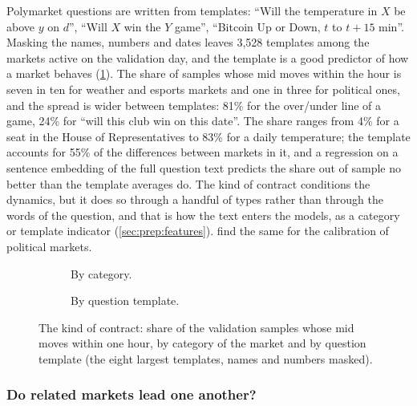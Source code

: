 Polymarket questions are written from templates: ``Will the temperature in $X$ be above
$y$ on $d$'', ``Will $X$ win the $Y$ game'', ``Bitcoin Up or Down, $t$ to $t + 15$ min''.
Masking the names, numbers and dates leaves 3{,}528 templates among the markets active on
the validation day, and the template is a good predictor of how a market behaves
(\cref{fig:expl:contract}).  The share of samples whose mid moves within the hour is seven
in ten for weather and esports markets and one in three for political ones, and the spread
is wider between templates: 81\% for the over/under line of a game, 24\% for ``will this
club win on this date''.  The share ranges from 4\% for a seat in the House of
Representatives to 83\% for a daily temperature; the template accounts for 55\% of the
differences between markets in it, and a regression on a sentence embedding of the full
question text predicts the share out of sample no better than the template averages do.  The kind of
contract conditions the dynamics, but it does so through a handful of types rather than
through the words of the question, and that is how the text enters the models, as a
category or template indicator (\cref{sec:prep:features}).  \textcite{le2026calibration}
find the same for the calibration of political markets.

\begin{figure}[t]
\centering
\begin{subfigure}[t]{0.5\textwidth}\centering\caption{By category.}\end{subfigure}%
\begin{subfigure}[t]{0.5\textwidth}\centering\caption{By question template.}\end{subfigure}
\caption{The kind of contract: share of the validation samples whose mid moves within one
hour, by category of the market and by question template (the eight largest templates,
names and numbers masked).}
\label{fig:expl:contract}
\end{figure}

\subsubsection{Do related markets lead one another?}
\label{sec:expl:siblings}

